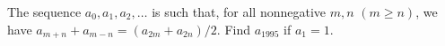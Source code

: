 The sequence $a_0, a_1, a_2, \ldots$ is such that, for all nonnegative $m, n$ $(m \geq n)$, we have $a_{m+n} + a_{m-n} = (a_{2m} + a_{2n})/2$. Find $a_{1995}$ if $a_1 = 1$.
